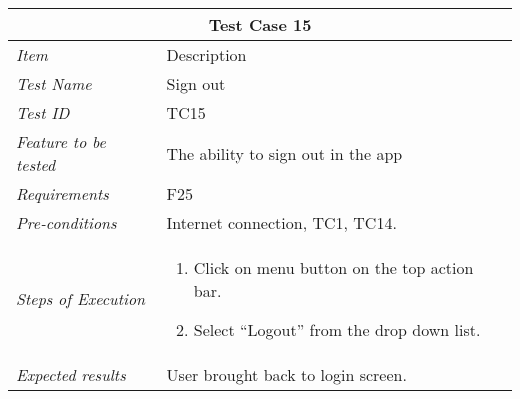 \begin{minipage}{\linewidth}
\setlength{\tabcolsep}{15pt}
\centering
{}
\begin{tabular}{ |l|p{70mm}| }
	\hline
	\multicolumn{2}{|c|}{\cellcolor{gray!25} \textbf{Test Case 15}} \\
	\hline
	\it{\cellcolor{gray!25}Item} & {\cellcolor{gray!25} Description } \\
	\hline
	\it{\cellcolor{gray!25}Test Name } & Sign out \\ \hline
	\it{\cellcolor{gray!25}Test ID} & TC15 \\ \hline
	\it{\cellcolor{gray!25}Feature to be tested} & The ability to sign out in the app \\ \hline
	\it{\cellcolor{gray!25}Requirements} & F25  \\ \hline
	\it{\cellcolor{gray!25}Pre-conditions} & Internet connection, TC1, TC14. \\ \hline
	\it{\cellcolor{gray!25}Steps of Execution} & \begin{enumerate}
	                                       \item Click on menu button on the top action bar. 
	                                       \item Select “Logout” from the drop down list.
	                                     \end{enumerate} \\ \hline
	\it{\cellcolor{gray!25}Expected results} & User brought back to login screen. \\
	\hline
\end{tabular}
\medskip
\end{minipage}
%
